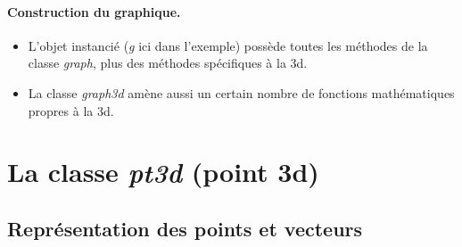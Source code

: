 \paragraph{Construction du graphique.}

\begin{itemize}
    \item L'objet instancié (\emph{g} ici dans l'exemple) possède toutes les méthodes de la classe \emph{graph}, plus des méthodes spécifiques à la 3d.
    \item La classe \emph{graph3d} amène aussi un certain nombre de fonctions mathématiques propres à la 3d.
\end{itemize}


\section{La classe \emph{pt3d} (point 3d)}

\subsection{Représentation des points et vecteurs}

